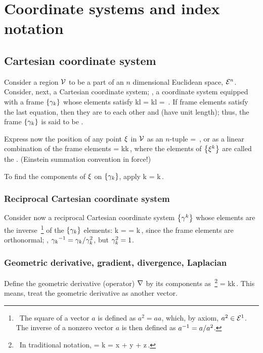 \section{Coordinate systems and index notation}

\subsection{Cartesian coordinate system}
Consider a region $\mathcal{V}$ to be a part of an $n$ dimensional Euclidean space, $\mathcal{E}^{n}$. Consider, next, a Cartesian coordinate system; \ie, a coordinate system equipped with a frame $\left\lbrace{\gamma_{k}}\right\rbrace$ whose elements satisfy
\beq
\fbvec k\iprod\fbvec l = \fmet kl = \,.
\eeq
If frame elements satisfy the last equation, then they are  to each other and  (have unit length); thus, the frame $\left\lbrace{\gamma_{k}}\right\rbrace$ is said to be .

Express now the position of any point $\xi$ in $\mathcal{V}$ as an $n$-tuple
\beq
\pos = \,,
\eeq
or as a linear combination of the frame elements
\beq
\pos = \fvec\pos k\fbvec k\,,
\eeq
where the elements of $\left\lbrace{{\xi}^{k}}\right\rbrace$ are called the . (Einstein summation convention in force!)

To find the components of $\xi$ on $\left\lbrace{\gamma_{k}}\right\rbrace$, apply
\beq
\fvec\pos k = \pos\iprod\fbvec k\,.
\eeq


\subsubsection{Reciprocal Cartesian coordinate system}
Consider now a reciprocal Cartesian coordinate system $\left\lbrace{\gamma^{k}}\right\rbrace$ whose elements are the inverse~\footnote{~The square of a vector $a$ is defined as $a^2 = aa$, which, by axiom, $a^2\in\mathcal{E}^{1}$. The inverse of a nonzero vector $a$ is then defined as ${a}^{-1} = a/a^2$.} of the $\left\lbrace{\gamma_{k}}\right\rbrace$ elements:
\beq
\rbvec k =  = \fbvec k\,,
\eeq
since the frame elements are orthonormal; \viz, ${\gamma_{k}}^{-1} = \gamma_{k}/\gamma_{k}^2$, but $\gamma_{k}^2 = 1$.


\subsubsection{Geometric derivative, gradient, divergence, Laplacian}
Define the geometric derivative (operator) $\nabla$ by its components as~\footnote{~In traditional notation, 
\beq
\gder = \rbvec k 
      = \uvec x + \uvec y + \uvec z\,.
\eeq}
\beq
\gder = \rbvec k\ipd k\,.
\eeq
This means, treat the geometric derivative as another vector.

